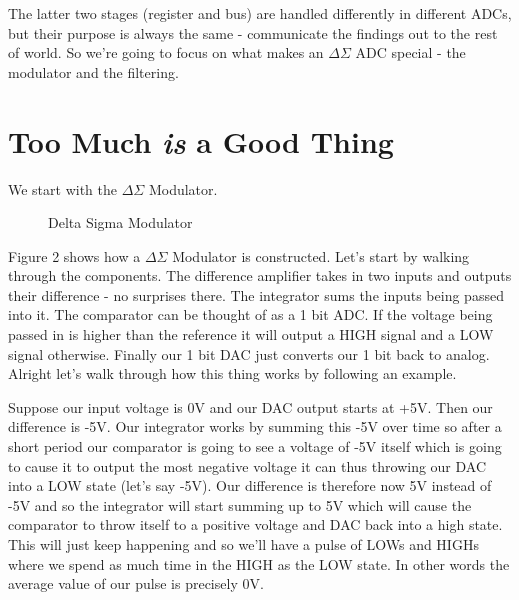 \documentclass[12pt,a6paper]{book}
\begin{document}
The latter two stages (register and bus) are handled differently in different ADCs, but their purpose is always the same - communicate the findings out to the rest of world. So we're going to focus on what makes an $\Delta \Sigma$ ADC special - the modulator and the filtering.  

\section{Too Much \textit{is} a Good Thing}
We start with the $\Delta \Sigma$ Modulator.  

\begin{figure}[!htb]
\caption{\label{fig:my-label} Delta Sigma Modulator}
\end{figure}

Figure 2 shows how a $\Delta \Sigma$ Modulator is constructed. Let's start by walking through the components. The difference amplifier takes in two inputs and outputs their difference - no surprises there. The integrator sums the inputs being passed into it. The comparator can be thought of as a 1 bit ADC. If the voltage being passed in is higher than the reference it will output a HIGH signal and a LOW signal otherwise. Finally our 1 bit DAC just converts our 1 bit back to analog. Alright let's walk through how this thing works by following an example.

Suppose our input voltage is 0V and our DAC output starts at +5V. Then our difference is -5V. Our integrator works by summing this -5V over time so after a short period our comparator is going to see a voltage of -5V itself which is going to cause it to output the most negative voltage it can thus throwing our DAC into a LOW state (let's say -5V). Our difference is therefore now 5V instead of -5V and so the integrator will start summing up to 5V which will cause the comparator to throw itself to a positive voltage and DAC back into a high state. This will just keep happening and so we'll have a pulse of LOWs and HIGHs where we spend as much time in the HIGH as the LOW state. In other words the average value of our pulse is precisely 0V. 
\end{document}
